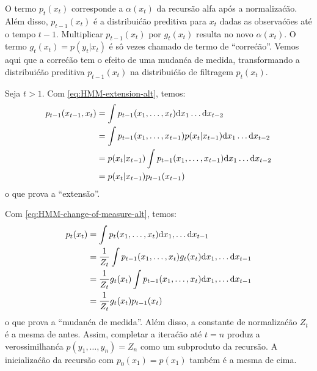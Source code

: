 \begin{exenumerate}
    O termo $p_{t}(x_t)$ corresponde a $\alpha(x_t)$ da
    recurs\~ao alfa ap\'os a normaliza\'c\~ao. Al\'em disso, $p_{t-1}(x_t)$ \'e a
    distribui\'c\~ao preditiva para $x_t$ dadas as observa\'c\~oes at\'e o tempo
    $t-1$. Multiplicar $p_{t-1}(x_t)$ por $g_t(x_t)$ resulta no novo
    $\alpha(x_t)$. O termo $g_t(x_t) = p(y_t|x_t)$ \'e s\^o vezes chamado
    de termo de ``corre\'c\~ao''. Vemos aqui que a corre\'c\~ao tem o
    efeito de uma mudan\'ca de medida, transformando a distribui\'c\~ao preditiva
    $p_{t-1}(x_t)$ na distribui\'c\~ao de filtragem $p_t(x_t)$.
    
    \begin{solution}
        Seja $t>1$. Com \eqref{eq:HMM-extension-alt}, temos:
        \begin{align}
            p_{t-1}(x_{t-1}, x_t) & = \int p_{t-1}(x_1, \ldots, x_t) \mathrm{d} x_1 \ldots \mathrm{d} x_{t-2}\\
            &=  \int p_{t-1}(x_1, \ldots, x_{t-1}) p(x_t|x_{t-1})  \mathrm{d} x_1 \ldots \mathrm{d} x_{t-2}\\
            &=  p(x_t|x_{t-1})  \int p_{t-1}(x_1, \ldots, x_{t-1}) \mathrm{d} x_1 \ldots \mathrm{d} x_{t-2}\\
            & =  p(x_t|x_{t-1}) p_{t-1}(x_{t-1})
        \end{align}
        o que prova a ``extens\~ao''.
        
        Com \eqref{eq:HMM-change-of-measure-alt}, temos:
        \begin{align}
            p_t(x_t) & = \int  p_{t}(x_1, \ldots, x_{t}) \mathrm{d} x_1, \ldots \mathrm{d} x_{t-1}\\
            &=  \frac{1}{Z_t} \int p_{t-1}(x_1, \ldots, x_t) g_t(x_t) \mathrm{d} x_1, \ldots \mathrm{d} x_{t-1}\\
            & = \frac{1}{Z_t} g_t(x_t) \int p_{t-1}(x_1, \ldots, x_t)  \mathrm{d} x_1, \ldots \mathrm{d} x_{t-1}\\
            & = \frac{1}{Z_t} g_t(x_t) p_{t-1}(x_t)
        \end{align}
        o que prova a ``mudan\'ca de medida''. Al\'em disso, a constante de
        normaliza\'c\~ao $Z_t$ \'e a mesma de antes. Assim, completar a
        itera\'c\~ao at\'e $t=n$ produz a verossimilhan\'ca $p(y_1, \ldots, y_n) =
        Z_n$ como um subproduto da recurs\~ao. A inicializa\'c\~ao da
        recurs\~ao com $p_0(x_1)=p(x_1)$ tamb\'em \'e a mesma de cima.
        
    \end{solution}
    
\end{exenumerate}


